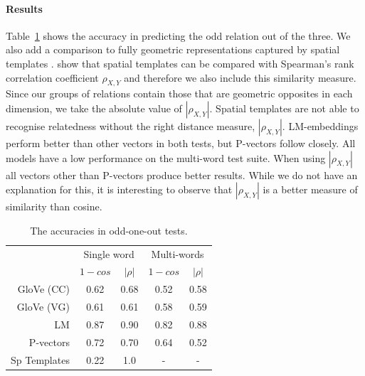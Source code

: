 \paragraph{Results} Table~\ref{splu2019:tab:oddones} shows the accuracy in predicting
the odd relation out of the three. We also add a comparison to fully geometric
representations captured by spatial templates \cite{logan/sadler:1996}.
\citet{Ghanimifard:2017ab} show that spatial templates can be compared with
Spearman's rank correlation coefficient $\rho_{X,Y}$ and therefore we also
include this similarity measure. Since our groups of relations contain those
that are geometric opposites in each dimension, we take the absolute value of
$|\rho_{X,Y}|$.
Spatial templates are not able to recognise relatedness without the right
distance measure, $|\rho_{X,Y}|$.
LM-embeddings perform better than other vectors in both tests, but P-vectors
follow closely. All models have a low performance on the multi-word test suite.
When using $|\rho_{X,Y}|$
all vectors other than P-vectors produce better results. While we do not have
an explanation for this, it is interesting to observe that $|\rho_{X,Y}|$ is a
better measure of similarity than cosine.


\begin{table}
    \centering 
      \begin{tabular}{r|cc|cc}
        & \multicolumn{2}{c|}{Single word} & \multicolumn{2}{|c}{Multi-words} \\
        & $1-cos$ & $|\rho|$ & $1-cos$ & $|\rho|$ \\
      \hline
      GloVe (CC)   & 0.62 & 0.68 & 0.52 & 0.58 \\
      GloVe (VG)   & 0.61 & 0.61 & 0.58 & 0.59 \\
      \hline
      LM           & 0.87 & 0.90 & 0.82 & 0.88 \\
      P-vectors    & 0.72 & 0.70 & 0.64 & 0.52 \\
      \hline
      Sp Templates & 0.22 & 1.0  &  -   &  -   \\
      \end{tabular}
  \vspace{0.5em}
    \caption{The accuracies in odd-one-out tests.}
    \label{splu2019:tab:oddones}
\end{table}



